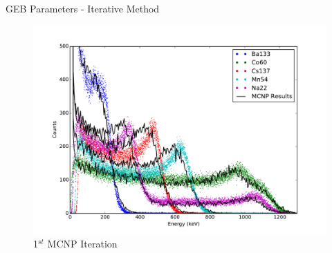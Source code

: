 \documentclass{beamer}
\begin{document}
\begin{frame}{GEB Parameters - Iterative Method}
\begin{figure}
\vspace{-0.25cm}
\begin{center}
\includegraphics[scale = 0.35]{MCNP_Comparison_1cal}
\vspace{-0.4cm}
\caption{\scriptsize{1$^{st}$ MCNP Iteration}}
\end{center}
\end{figure}
\end{frame}
\end{document}
